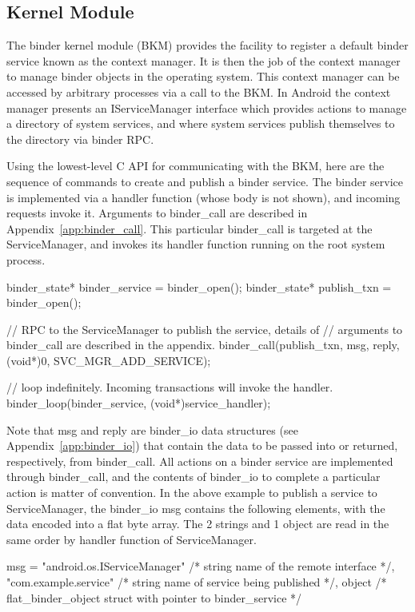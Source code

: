 \documentclass[prodmode]{acmlarge}
\begin{document}
\subsection{Kernel Module}
The binder kernel module (BKM) provides the facility to register a default binder service known as the context manager. It is then the job of the context manager to manage binder objects in the operating system. This context manager can be accessed by arbitrary processes via a call to the BKM. In Android the context manager presents an IServiceManager interface which provides actions to manage a directory of system services, and where system services publish themselves to the directory via binder RPC.

Using the lowest-level C API for communicating with the BKM, here are the sequence of commands to create and publish a binder service. The binder service is implemented via a handler function (whose body is not shown), and incoming requests invoke it. Arguments to binder\_call are described in Appendix~\ref{app:binder_call}. This particular binder\_call is targeted at the ServiceManager, and invokes its handler function running on the root system process.

\begin{snippet}[label=snip:binder_call,caption=binder\_call to publish a service with ServiceManager]
binder_state* binder_service = binder_open();
binder_state* publish_txn = binder_open();

// RPC to the ServiceManager to publish the  service, details of
// arguments to binder_call  are described in the appendix.
binder_call(publish_txn, msg, reply, (void*)0, SVC_MGR_ADD_SERVICE);

// loop indefinitely. Incoming transactions  will invoke the handler.
binder_loop(binder_service, (void*)service_handler);
\end{snippet}

Note that msg and reply are binder\_io data structures (see Appendix~\ref{app:binder_io}) that contain the data to be passed into or returned, respectively, from binder\_call. All actions on a binder service are implemented through binder\_call, and the contents of binder\_io to complete a particular action is matter of convention. In the above example to publish a service to ServiceManager, the binder\_io msg contains the following elements, with the data encoded into a flat byte array. The 2 strings and 1 object are read in the same order by handler function of ServiceManager.

\begin{snippet}[caption=contents of msg passed into binder\_call]
msg = {
  "android.os.IServiceManager" /* string name of the remote interface */,
  "com.example.service" /* string name of service being published */,
  object /* flat_binder_object struct with pointer to binder_service */
}
\end{snippet}
\end{document}
